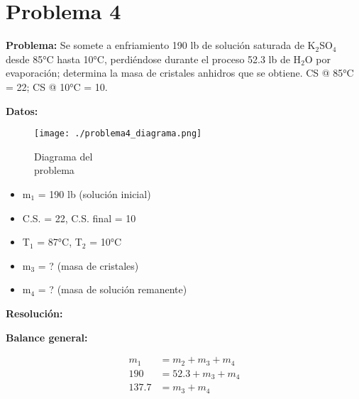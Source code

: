 \documentclass{article} %
\begin{document}
\newpage %
\section*{Problema 4} %
\textbf{Problema:} Se somete a enfriamiento 190 lb de solución saturada de K$_2$SO$_4$ desde 85°C hasta 10°C, perdiéndose durante el proceso 52.3 lb de H$_2$O por evaporación; determina la masa de cristales anhidros que se obtiene.
CS @ 85°C = 22; CS @ 10°C = 10.

\noindent\textbf{Datos:} %

\begin{figure}[H]
    \begin{minipage}[t]{0.3\textwidth} %
        \raggedright %
        \texttt{[image: ./problema4\_diagrama.png]} %
        \caption{Diagrama del \\ problema}
    \end{minipage}
\end{figure}

\textbf{} %
\begin{itemize}
\item m$_1$ = 190 lb (solución inicial)
\item C.S. = 22, C.S. final = 10
\item T$_1$ = 87°C, T$_2$ = 10°C
\item m$_3$ = ? (masa de cristales)
\item m$_4$ = ? (masa de solución remanente)
\end{itemize}


\noindent\textbf{Resolución:} %

\textbf{Balance general:}

\begin{align*}
    m_1 &= m_2 + m_3 + m_4 \\[10pt]
    190 &= 52.3 + m_3 + m_4 \\[10pt]
    137.7 &= m_3 + m_4
\end{align*}
\end{document}
